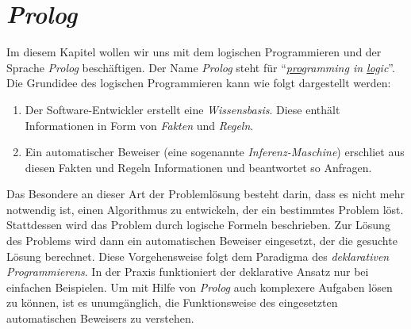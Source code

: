 \chapter{\textsl{Prolog}} 
Im diesem Kapitel wollen wir uns mit dem logischen Programmieren und der
Sprache \textsl{Prolog} besch\"{a}ftigen.  Der Name \textsl{Prolog} steht f\"{u}r 
``\emph{\underline{pro}gramming in \underline{log}ic}''.
Die Grundidee des logischen Programmieren 
kann wie folgt dargestellt werden:
\begin{enumerate}
\item Der Software-Entwickler erstellt eine \emph{Wissensbasis}.
      Diese enth\"{a}lt Informationen in Form von \emph{Fakten} und \emph{Regeln}.
\item Ein automatischer Beweiser (eine sogenannte \emph{Inferenz-Maschine})
      erschlie\3t aus diesen Fakten und Regeln
      Informationen und beantwortet so Anfragen.
\end{enumerate}
Das Besondere an dieser Art der Probleml\"{o}sung besteht darin, dass es nicht mehr notwendig
ist, einen Algorithmus zu entwickeln, der ein bestimmtes Problem l\"{o}st.  Stattdessen
wird das Problem durch logische Formeln beschrieben.  Zur L\"{o}sung des Problems
wird dann ein automatischen Beweiser eingesetzt, der die gesuchte L\"{o}sung berechnet.
Diese Vorgehensweise folgt dem Paradigma des \emph{deklarativen Programmierens}.
In der Praxis funktioniert der deklarative Ansatz nur bei einfachen Beispielen.  Um mit
Hilfe von \textsl{Prolog} auch komplexere Aufgaben l\"{o}sen zu k\"{o}nnen, ist es unumg\"{a}nglich, die
Funktionsweise des eingesetzten automatischen Beweisers zu verstehen.

